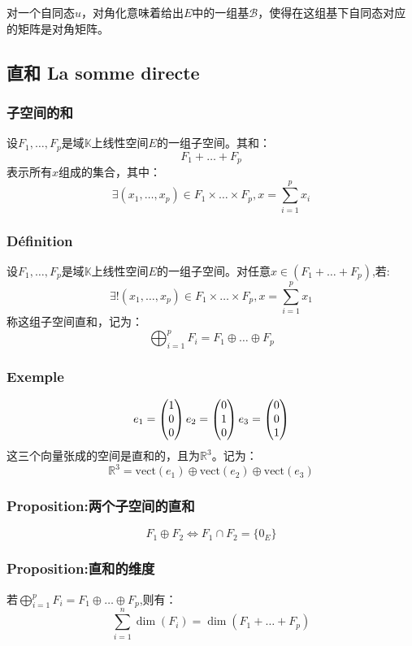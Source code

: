 \documentclass[12pt, a4paper, oneside]{ctexbook}
\begin{document}
  对一个自同态$u$，对角化意味着给出$E$中的一组基$\mathcal{B}$，使得在这组基下自同态对应的矩阵是对角矩阵。
  \subsection{直和 La somme directe}
  \subsubsection{子空间的和}
  设$F_1,\dots,F_p$是域$\mathbb{K}$上线性空间$E$的一组子空间。其和：
  $$
  F_1+\dots+F_p
  $$
  表示所有$x$组成的集合，其中：
  $$
  \exists(x_1,\dots,x_p)\in F_1\times\dots\times F_p, x=\sum_{i=1}^{p}x_i
  $$
  \subsubsection{Définition}
  设$F_1,\dots,F_p$是域$\mathbb{K}$上线性空间$E$的一组子空间。对任意$x\in(F_1+\dots+F_p)$,若:
  $$
    \exists!(x_1,\dots,x_p)\in F_1\times\dots\times F_p,  
    x=\sum_{i=1}^{p}x_1
  $$
  称这组子空间直和，记为：
  $$
    \bigoplus _{i=1}^pF_i=F_1\oplus\dots\oplus F_p
  $$
  \subsubsection{Exemple}
  \begin{equation}
    \notag
    e_1=\begin{pmatrix} 1 \\ 0 \\ 0 \end{pmatrix}
    e_2=\begin{pmatrix} 0 \\ 1 \\ 0 \end{pmatrix}
    e_3=\begin{pmatrix} 0 \\ 0 \\ 1 \end{pmatrix}
  \end{equation}
  这三个向量张成的空间是直和的，且为$\mathbb{R}^3$。记为：
  $$
  \mathbb{R}^3=\mbox{vect}(e_1)\oplus\mbox{vect}(e_2)\oplus\mbox{vect}(e_3)
  $$
  \subsubsection{Proposition:两个子空间的直和}
  $$
  F_1\oplus F_2 \Leftrightarrow F_1\cap F_2=\{0_E\}
  $$
  \subsubsection{Proposition:直和的维度}
  若$\bigoplus _{i=1}^pF_i=F_1\oplus\dots\oplus F_p$,则有：
  $$
  \sum_{i=1}^{n}\dim(F_i)=\dim(F_1+\dots+F_p)
  $$
\end{document}
